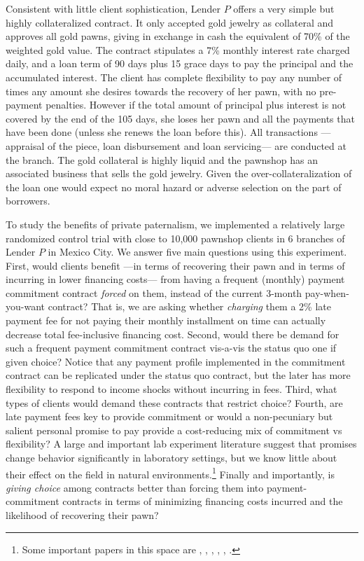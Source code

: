 \documentclass[11pt]{article}
\begin{document}
Consistent with little client sophistication, Lender $P$ offers a very simple but highly collateralized contract. It only accepted gold jewelry as collateral and approves all gold pawns, giving in exchange in cash the equivalent of 70\% of the weighted gold value. The contract stipulates a 7\% monthly interest rate charged daily, and a loan term of 90 days plus 15 grace days to pay the principal and the accumulated interest. The client has complete flexibility to pay any number of times any amount she desires towards the recovery of her pawn, with no pre-payment penalties. However if the total amount of principal plus interest is not covered by the end of the 105 days, she loses her pawn and all the payments that have been done (unless she renews the loan before this). All transactions ---appraisal of the piece, loan disbursement and loan servicing--- are conducted at the branch. The gold collateral is highly liquid and the pawnshop has an associated business that sells the gold jewelry. Given the over-collateralization of the loan one would expect no moral hazard or adverse selection on the part of borrowers. %

To study the benefits of private paternalism, we implemented a relatively large randomized control trial with close to 10,000 pawnshop clients in 6 branches of Lender $P$ in Mexico City. We answer five main questions using this experiment. First, would clients benefit  ---in terms of recovering their pawn and in terms of incurring in lower financing costs---  from having a frequent (monthly) payment commitment contract \textit{forced} on them, instead of the current 3-month pay-when-you-want contract? That is, we are asking whether \textit{charging} them a 2\% late payment fee for not paying their monthly installment on time can actually decrease total fee-inclusive financing cost. Second, would there be demand for such a frequent payment commitment contract vis-a-vis the status quo one if given choice? Notice that any payment profile implemented in the commitment contract can be replicated under the status quo contract, but the later has more flexibility to respond to income shocks without incurring in fees. Third, what types of clients would demand these contracts that restrict choice? Fourth, are late payment fees key to provide commitment or would a non-pecuniary but salient personal promise to pay provide a cost-reducing mix of commitment vs flexibility? A large and important lab experiment literature suggest that promises change behavior significantly in laboratory settings, but we know little about their effect on the field in natural environments.\footnote{Some important papers in this space are \cite{PromisesPartnerships}, \cite{Vanberg}, \cite{Belot2010}, \cite{WhyDoPromises}, \cite{FurtherPromises}, \cite{Ismayilov2017}.} Finally and importantly, is \textit{giving choice} among contracts better than forcing them into payment-commitment contracts in terms of minimizing financing costs incurred and the likelihood of recovering their pawn? 
\end{document}
